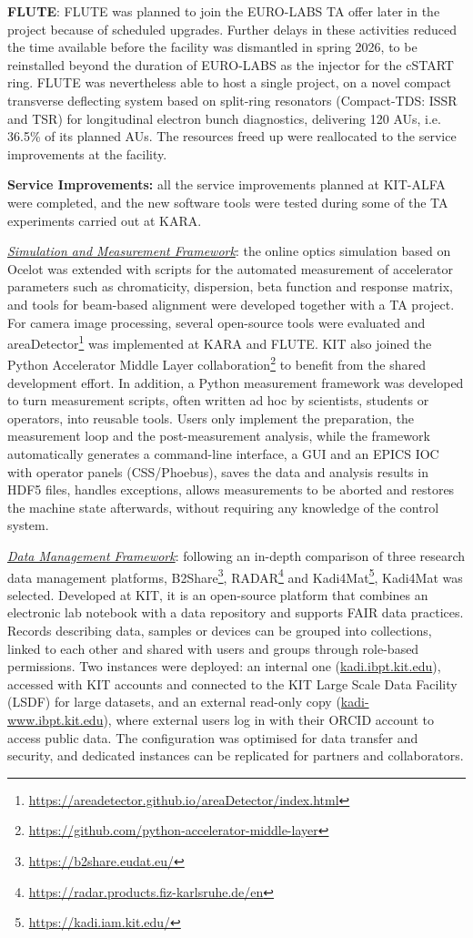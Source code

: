 \textbf{FLUTE}: FLUTE was planned to join the EURO-LABS TA offer later in the project because of scheduled upgrades. Further delays in these activities reduced the time available before the facility was dismantled in spring 2026, to be reinstalled beyond the duration of EURO-LABS as the injector for the cSTART ring. FLUTE was nevertheless able to host a single project, on a novel compact transverse deflecting system based on split-ring resonators (Compact-TDS: ISSR and TSR) for longitudinal electron bunch diagnostics, delivering 120 AUs, i.e. 36.5\% of its planned AUs. The resources freed up were reallocated to the service improvements at the facility.

\textbf{Service Improvements:} all the service improvements planned at KIT-ALFA were completed, and the new software tools were tested during some of the TA experiments carried out at KARA.

\underline{\em{Simulation and Measurement Framework}}: the online optics simulation based on Ocelot was extended with scripts for the automated measurement of accelerator parameters such as chromaticity, dispersion, beta function and response matrix, and tools for beam-based alignment were developed together with a TA project. For camera image processing, several open-source tools were evaluated and areaDetector\footnote{\url{https://areadetector.github.io/areaDetector/index.html}} was implemented at KARA and FLUTE. KIT also joined the Python Accelerator Middle Layer collaboration\footnote{\url{https://github.com/python-accelerator-middle-layer}} to benefit from the shared development effort. In addition, a Python measurement framework was developed to turn measurement scripts, often written ad hoc by scientists, students or operators, into reusable tools. Users only implement the preparation, the measurement loop and the post-measurement analysis, while the framework automatically generates a command-line interface, a GUI and an EPICS IOC with operator panels (CSS/Phoebus), saves the data and analysis results in HDF5 files, handles exceptions, allows measurements to be aborted and restores the machine state afterwards, without requiring any knowledge of the control system.

\underline{\em{Data Management Framework}}: following an in-depth comparison of three research data management platforms, B2Share\footnote{\url{https://b2share.eudat.eu/}}, RADAR\footnote{\url{https://radar.products.fiz-karlsruhe.de/en}} and Kadi4Mat\footnote{\url{https://kadi.iam.kit.edu/}}, Kadi4Mat was selected. Developed at KIT, it is an open-source platform that combines an electronic lab notebook with a data repository and supports FAIR data practices. Records describing data, samples or devices can be grouped into collections, linked to each other and shared with users and groups through role-based permissions. Two instances were deployed: an internal one (\url{kadi.ibpt.kit.edu}), accessed with KIT accounts and connected to the KIT Large Scale Data Facility (LSDF) for large datasets, and an external read-only copy (\url{kadi-www.ibpt.kit.edu}), where external users log in with their ORCID account to access public data. The configuration was optimised for data transfer and security, and dedicated instances can be replicated for partners and collaborators.

